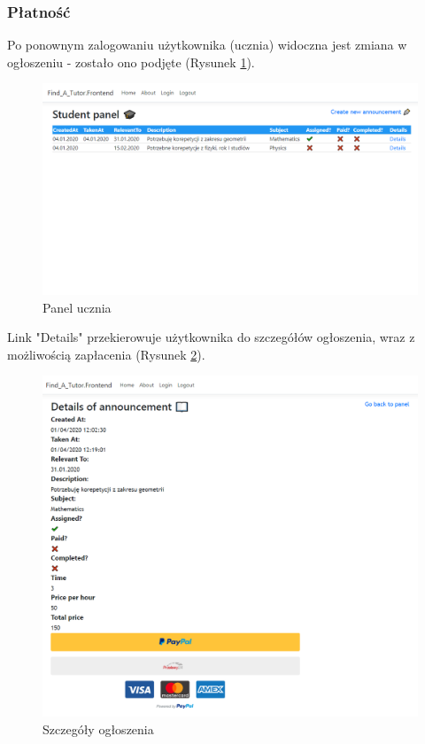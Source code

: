 \documentclass[12pt]{article}
\numberwithin{figure}{section}
\begin{document}
\begin{sloppypar}
\subsubsection{Płatność}
Po ponownym zalogowaniu użytkownika (ucznia) widoczna jest zmiana w ogłoszeniu - zostało ono podjęte (Rysunek \ref{fig:student-assigned}).
\begin{figure}[!htbp] 
    \centering
    \includegraphics[width=1\textwidth]{images/chapter_4/student-assigned.png}
    \caption{Panel ucznia}
    \label{fig:student-assigned}
\end{figure}

Link "Details" przekierowuje użytkownika do szczegółów ogłoszenia, wraz z możliwością zapłacenia (Rysunek \ref{fig:details}). 
\begin{figure}[!htbp] 
    \centering
    \includegraphics[width=1\textwidth]{images/chapter_4/details.png}
    \caption{Szczegóły ogłoszenia}
    \label{fig:details}
\end{figure}


\end{sloppypar}
\end{document}
